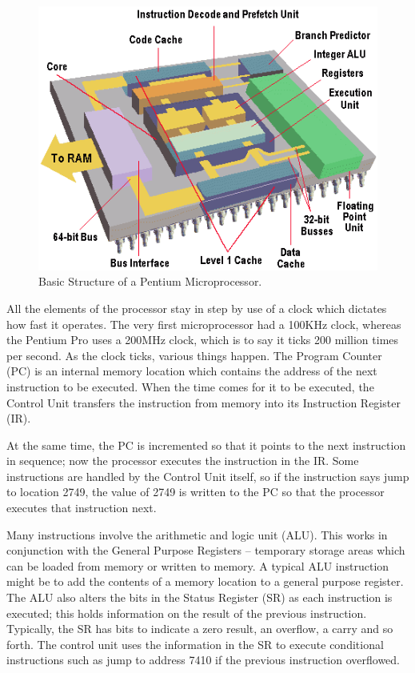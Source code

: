 \documentclass[doc,natbib,12pt]{apa6}
\begin{document}
	\begin{figure}[htpb]
		\centering
		\includegraphics[width=1\textwidth]{21proc.png}
		\caption{\label{fig:structure}Basic Structure of a Pentium Microprocessor. \citep{pctechguide}}
	\end{figure}
	
	
	All the elements of the processor stay in step by use of a clock which dictates how fast it operates. The very first microprocessor had a 100KHz clock, whereas the Pentium Pro uses a 200MHz clock, which is to say it ticks 200 million times per second. As the clock ticks, various things happen. The Program Counter (PC) is an internal memory location which contains the address of the next instruction to be executed. When the time comes for it to be executed, the Control Unit transfers the instruction from memory into its Instruction Register (IR). \citep{pctechguide}
	
	At the same time, the PC is incremented so that it points to the next instruction in sequence; now the processor executes the instruction in the IR. Some instructions are handled by the Control Unit itself, so if the instruction says jump to location 2749, the value of 2749 is written to the PC so that the processor executes that instruction next. \citep{pctechguide}
	
	Many instructions involve the arithmetic and logic unit (ALU). This works in conjunction with the General Purpose Registers – temporary storage areas which can be loaded from memory or written to memory. A typical ALU instruction might be to add the contents of a memory location to a general purpose register. The ALU also alters the bits in the Status Register (SR) as each instruction is executed; this holds information on the result of the previous instruction. Typically, the SR has bits to indicate a zero result, an overflow, a carry and so forth. The control unit uses the information in the SR to execute conditional instructions such as jump to address 7410 if the previous instruction overflowed. \citep{pctechguide}
	
\end{document}
